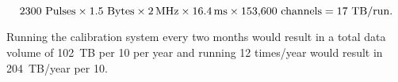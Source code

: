 
\begin{equation}
\num{2300}~{\rm Pulses} \times \num{1.5}~{\rm Bytes}\times
\SI{2}{\mega\hertz}\times \SI{16.4}{\milli\s}\times \dpnumcrpch~{\rm channels} = \num{17}~{\rm TB/run}.
\end{equation}

Running the  calibration system every two months would result in a total data volume of \num{102}~TB per \SI{10}{\kt} per year and running \num{12} times/year would result in \num{204}~TB/year per \SI{10}{\kt}. 





